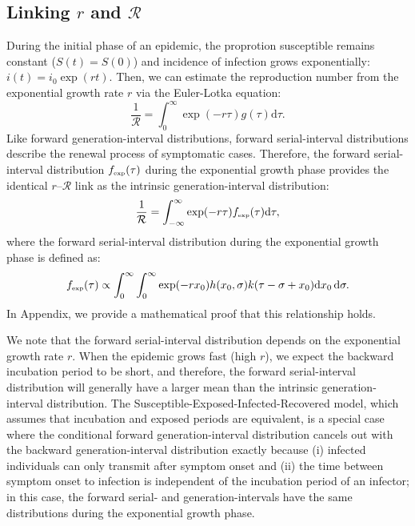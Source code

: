 \documentclass[12pt]{article}
\begin{document}
\subsection{Linking $r$ and $\mathcal R$}

During the initial phase of an epidemic, the proprotion susceptible remains constant ($S(t) = S(0)$) and incidence of infection grows exponentially: $i(t)=i_0\exp(rt)$.
Then, we can estimate the reproduction number from the exponential growth rate $r$ via the Euler-Lotka equation:
\begin{equation}
\frac{1}{\mathcal R} = \int_0^\infty \exp(-r\tau) g(\tau) \mathrm{d} \tau.
\end{equation}
Like forward generation-interval distributions, 
forward serial-interval distributions describe the renewal process of symptomatic cases.
Therefore, the forward serial-interval distribution $f_{\textrm{\tiny exp}}(\tau)$ during the exponential growth phase provides the identical $r$--$\mathcal R$ link as the intrinsic generation-interval distribution:
\begin{equation}
\frac{1}{\mathcal R} = \int_{-\infty}^\infty \exp(-r\tau) f_{\textrm{\tiny exp}}(\tau) \mathrm{d} \tau,
\end{equation}
where the forward serial-interval distribution during the exponential growth phase is defined as:
\begin{equation}
f_{\textrm{\tiny exp}}(\tau) \propto \int_{0}^\infty \int_{0}^\infty \exp( -r x_0) h(x_0, \sigma) k(\tau-\sigma+x_0) \mathrm{d} x_0\, \mathrm{d}\sigma.
\end{equation}
In Appendix, we provide a mathematical proof that this relationship holds.

We note that the forward serial-interval distribution depends on the exponential growth rate $r$.
When the epidemic grows fast (high $r$), we expect the backward incubation period to be short, and therefore, the forward serial-interval distribution will generally have a larger mean than the intrinsic generation-interval distribution.
The Susceptible-Exposed-Infected-Recovered model, which assumes that incubation and exposed periods are equivalent, is a special case where the conditional forward generation-interval distribution cancels out with the backward generation-interval distribution exactly because (i) infected individuals can only transmit after symptom onset and (ii) the time between symptom onset to infection is independent of the incubation period of an infector;
in this case, the forward serial- and generation-intervals have the same distributions during the exponential growth phase.
\end{document}

